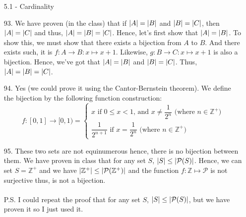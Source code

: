 \documentclass[12pt, a4paper]{article}
\newcommand{\ints}{\mathbb{Z}}
\newcommand{\pints}{\mathbb{Z}^+}
\DeclarePairedDelimiter\abs{\lvert}{\rvert}
\newcommand{\rarr}{\rightarrow}
\begin{document}
\begin{itemize}
\item[]
\item[]
\item[]

{\Large 5.1 - Cardinality}
\item[93.]
We have proven (in the class) that if $\abs{A} = \abs{B}$ and $\abs{B} = \abs{C}$, then $\abs{A} = \abs{C}$ and thus, $\abs{A} = \abs{B} = \abs{C}$.
Hence, let's first show that $\abs{A} = \abs{B}$. To show this, we must show that there exists a bijection from $A$ to $B$.
And there exists such, it is $f : A \rarr B : x \mapsto x + 1$. Likewise, $g : B \rarr C : x \mapsto x + 1$ is also a bijection.
Hence, we've got that $\abs{A} = \abs{B}$ and $\abs{B} = \abs{C}$. Thus, $\abs{A} = \abs{B} = \abs{C}$.

\item[]

\item[94.]
Yes (we could prove it using the Cantor-Bernstein theorem).
We define the bijection by the following function construction:
$$f : [0, 1] \rarr [0, 1)=  \begin{cases} x \mbox{ if $0 \leq x < 1$, and $x \neq \dfrac{1}{2^n}$ (where $n \in \pints$)} \\ \dfrac{1}{2^{n + 1}} \mbox{ if $x = \dfrac{1}{2^n}$ (where $n \in \pints$)} \end{cases}$$

\item[]

\item[95.]
These two sets are not equinumerous hence, there is no bijection between them.
We have proven in class that for any set $S$, $\abs{S} \leq \abs{\mathcal{P}(S)}$. Hence, we can set $S = \pints$
and we have $\abs{\pints} \leq \abs{\mathcal{P}(\pints)}$ and the function $f : \ints \mapsto \mathcal{P}$ is not surjective thus, is not a bijection.\\\\
P.S. I could repeat the proof that for any set $S$, $\abs{S} \leq \abs{\mathcal{P}(S)}$, but we have proven it so
I just used it.

\item[]
\item[]


\end{itemize}
\end{document}
